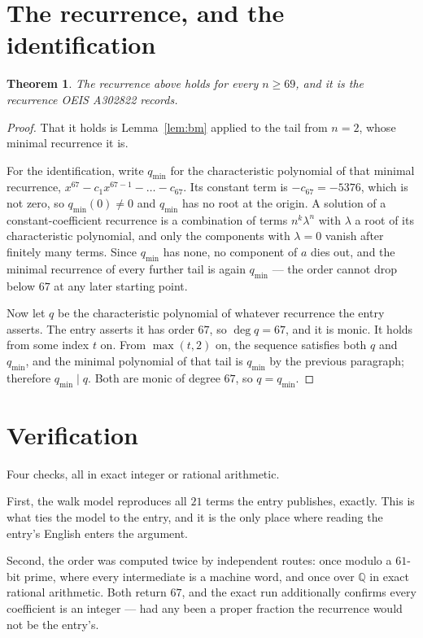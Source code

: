 \documentclass[11pt,a4paper]{article}
\theoremstyle{plain}
\newtheorem{theorem}{Theorem}
\theoremstyle{definition}
\begin{document}
\section{The recurrence, and the identification}

\begin{theorem}
The recurrence above holds for every $n\ge69$, and it is the recurrence OEIS A302822 records.
\end{theorem}

\begin{proof}
That it holds is Lemma~\ref{lem:bm} applied to the tail from $n=2$, whose minimal
recurrence it is.

For the identification, write $q_{\min}$ for the characteristic polynomial of that minimal
recurrence, $x^{67}-c_1x^{67-1}-\dots-c_{67}$. Its constant term is
$-c_{67}=-5376$, which is not zero, so $q_{\min}(0)\neq0$ and $q_{\min}$ has no
root at the origin. A solution of a constant-coefficient recurrence is a combination of terms
$n^{k}\lambda^{n}$ with $\lambda$ a root of its characteristic polynomial, and only the
components with $\lambda=0$ vanish after finitely many terms. Since $q_{\min}$ has none, no
component of $a$ dies out, and the minimal recurrence of every further tail is again
$q_{\min}$ --- the order cannot drop below $67$ at any later starting point.

Now let $q$ be the characteristic polynomial of whatever recurrence the entry asserts. The
entry asserts it has order $67$, so $\deg q=67$, and it is monic. It holds from some
index $t$ on. From $\max(t,2)$ on, the sequence satisfies both $q$ and $q_{\min}$, and
the minimal polynomial of that tail is $q_{\min}$ by the previous paragraph; therefore
$q_{\min}\mid q$. Both are monic of degree $67$, so $q=q_{\min}$.
\end{proof}

\section{Verification}

Four checks, all in exact integer or rational arithmetic.

First, the walk model reproduces all $21$ terms the entry publishes, exactly. This is
what ties the model to the entry, and it is the only place where reading the entry's English
enters the argument.

Second, the order was computed twice by independent routes: once modulo a $61$-bit prime, where
every intermediate is a machine word, and once over $\mathbb{Q}$ in exact rational arithmetic.
Both return $67$, and the exact run additionally confirms every coefficient is an integer
--- had any been a proper fraction the recurrence would not be the entry's.
\end{document}
